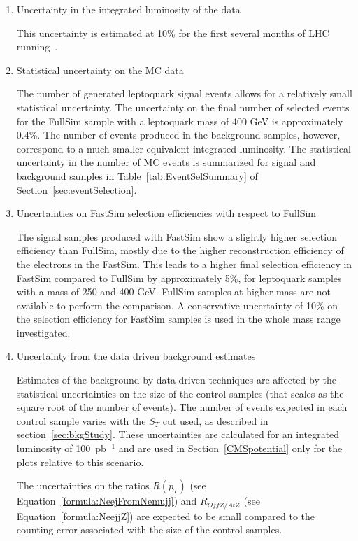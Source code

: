 \begin{enumerate}
\item Uncertainty in the integrated luminosity of the data

This uncertainty is estimated at 10\% for the first several months of LHC running~\cite{Ball:2007zza}. 
%
\item Statistical uncertainty on the MC data

The number of generated leptoquark signal events allows for a relatively small statistical uncertainty.
The uncertainty on the final number of selected events for the FullSim sample with a leptoquark mass of 400 GeV is 
approximately 0.4\%.  The number of events produced in the background samples, however, correspond to a much
smaller equivalent integrated luminosity.  
The statistical uncertainty in the number of MC events is summarized for signal and background samples 
in Table~\ref{tab:EventSelSummary} of Section~\ref{sec:eventSelection}.  
%
\item Uncertainties on FastSim selection efficiencies with respect to FullSim

The signal samples produced with FastSim show a slightly higher selection efficiency than FullSim, 
mostly due to the higher reconstruction efficiency of the electrons in the FastSim. 
This leads to a higher final selection efficiency in FastSim compared to FullSim by approximately 5\%, 
for leptoquark samples with a mass of 250 and 400 GeV. FullSim samples at higher mass are not available 
to perform the comparison. A conservative uncertainty of 10\% on the selection efficiency 
for FastSim samples is used in the whole mass range investigated. 
%
\item Uncertainty from the data driven background estimates

Estimates of the background by data-driven techniques are affected by the statistical
uncertainties on the size of the control samples (that scales as the square root of the number of events).
The number of events expected in each control sample varies with the $S_T$ cut used, as 
described in section~\ref{sec:bkgStudy}. 
These uncertainties are calculated for an integrated luminosity of 100~pb$^{-1}$ 
and are used in Section~\ref{CMSpotential} only for the plots relative to this scenario.

The uncertainties on the ratios $R(p_{T})$ (see Equation~\ref{formula:NeejFromNemujj})
and $R_{OffZ/AtZ}$ (see Equation~\ref{formula:NeejjZ})
are expected to be small compared to the counting error associated with the
size of the control samples.


\end{enumerate}
